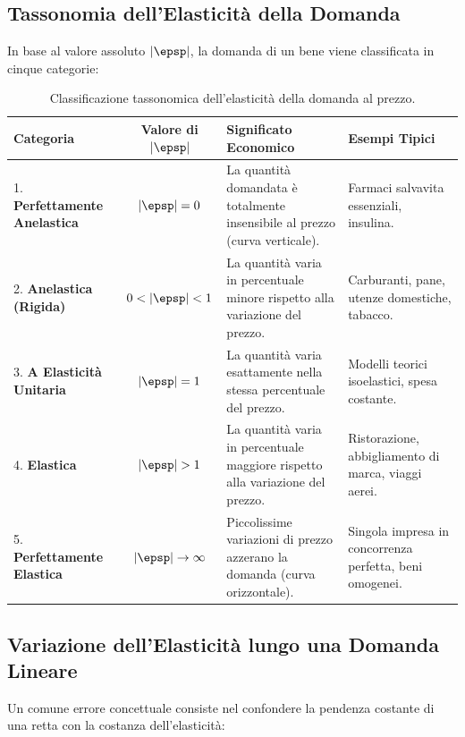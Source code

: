 \subsection{Tassonomia dell'Elasticità della Domanda}
In base al valore assoluto $|\epsp|$, la domanda di un bene viene classificata in cinque categorie:

\begin{table}[htbp]
\centering
\small
\renewcommand{\arraystretch}{1.35}
\begin{tabularx}{\textwidth}{l c X X}
\toprule
\textbf{Categoria} & \textbf{Valore di $|\epsp|$} & \textbf{Significato Economico} & \textbf{Esempi Tipici} \\
\midrule
1. \textbf{Perfettamente Anelastica} & $|\epsp| = 0$ & La quantità domandata è totalmente insensibile al prezzo (curva verticale). & Farmaci salvavita essenziali, insulina. \\
2. \textbf{Anelastica (Rigida)} & $0 < |\epsp| < 1$ & La quantità varia in percentuale minore rispetto alla variazione del prezzo. & Carburanti, pane, utenze domestiche, tabacco. \\
3. \textbf{A Elasticità Unitaria} & $|\epsp| = 1$ & La quantità varia esattamente nella stessa percentuale del prezzo. & Modelli teorici isoelastici, spesa costante. \\
4. \textbf{Elastica} & $|\epsp| > 1$ & La quantità varia in percentuale maggiore rispetto alla variazione del prezzo. & Ristorazione, abbigliamento di marca, viaggi aerei. \\
5. \textbf{Perfettamente Elastica} & $|\epsp| \to \infty$ & Piccolissime variazioni di prezzo azzerano la domanda (curva orizzontale). & Singola impresa in concorrenza perfetta, beni omogenei. \\
\bottomrule
\end{tabularx}
\caption{Classificazione tassonomica dell'elasticità della domanda al prezzo.}
\label{tab:classificazione_elasticita}
\end{table}

\subsection{Variazione dell'Elasticità lungo una Domanda Lineare}
Un comune errore concettuale consiste nel confondere la pendenza costante di una retta con la costanza dell'elasticità:

